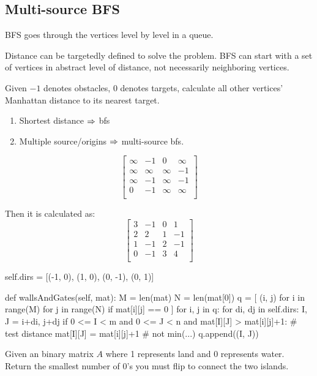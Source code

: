 \subsection{Multi-source BFS}

BFS goes through the vertices level by level in a queue. 

Distance can be targetedly defined to solve the problem. BFS can start with a set of vertices in abstract level of distance, not necessarily neighboring vertices.

 Given $-1$ denotes obstacles, $0$ denotes targets, calculate all other vertices' Manhattan distance to its nearest target.
\begin{enumerate}
\item Shortest distance $\Rightarrow$ bfs
\item Multiple source/origins $\Rightarrow$ multi-source bfs. 
\end{enumerate}
$$
\begin{bmatrix}
\infty & -1 & 0 & \infty \\
\infty & \infty & \infty & -1 \\
\infty & -1 & \infty & -1 \\
0 & -1 & \infty & \infty \\
\end{bmatrix}
$$

Then it is calculated as:
$$
\begin{bmatrix}
3 & -1 & 0 & 1 \\
2 & 2 & 1 & -1 \\
1 & -1 & 2 & -1 \\
0 & -1 & 3 & 4 \\
\end{bmatrix}
$$

\begin{python}
self.dirs = [(-1, 0), (1, 0), (0, -1), (0, 1)]

def wallsAndGates(self, mat):
  M = len(mat)
  N = len(mat[0])
  q = [
    (i, j) 
    for i in range(M)
    for j in range(N)
    if mat[i][j] == 0
  ]
  for i, j in q:
    for di, dj in self.dirs:
      I, J = i+di, j+dj
      if 0 <= I < m and 0 <= J < n 
        and mat[I][J] > mat[i][j]+1:  # test distance
        mat[I][J] = mat[i][j]+1  # not min(...)
        q.append((I, J))
\end{python}

 Given an binary matrix $A$ where 1 represents land and 0 represents water. Return the smallest number of 0's you must flip to connect the two islands.

